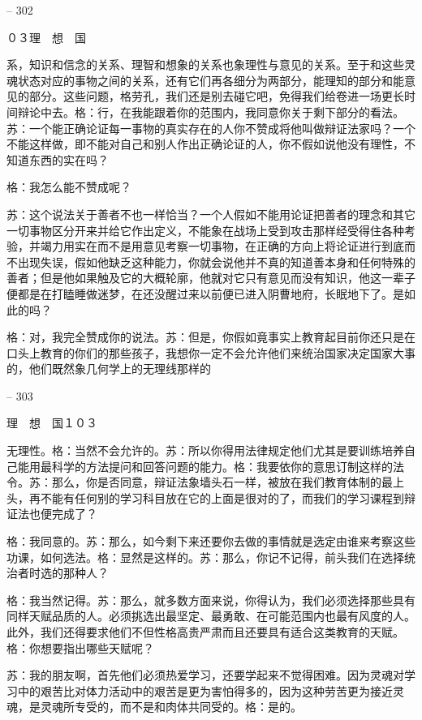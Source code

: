 \documentclass[11pt,oneside]{book}
\begin{document}
\begin{common-format}
    

-- 302

    ０３理　想　国

    系，知识和信念的关系、理智和想象的关系也象理性与意见的关系。至于和这些灵魂状态对应的事物之间的关系，还有它们再各细分为两部分，能理知的部分和能意见的部分。这些问题，格劳孔，我们还是别去碰它吧，免得我们给卷进一场更长时间辩论中去。格：行，在我能跟着你的范围内，我同意你关于剩下部分的看法。苏：一个能正确论证每一事物的真实存在的人你不赞成将他叫做辩证法家吗？一个不能这样做，即不能对自己和别人作出正确论证的人，你不假如说他没有理性，不知道东西的实在吗？

    格：我怎么能不赞成呢？

    苏：这个说法关于善者不也一样恰当？一个人假如不能用论证把善者的理念和其它一切事物区分开来并给它作出定义，不能象在战场上受到攻击那样经受得住各种考验，并竭力用实在而不是用意见考察一切事物，在正确的方向上将论证进行到底而不出现失误，假如他缺乏这种能力，你就会说他并不真的知道善本身和任何特殊的善者；但是他如果触及它的大概轮廓，他就对它只有意见而没有知识，他这一辈子便都是在打瞌睡做迷梦，在还没醒过来以前便已进入阴曹地府，长眠地下了。是如此的吗？

    格：对，我完全赞成你的说法。苏：但是，你假如竟事实上教育起目前你还只是在口头上教育的你们的那些孩子，我想你一定不会允许他们来统治国家决定国家大事的，他们既然象几何学上的无理线那样的

    

-- 303

    理　想　国１０３

    无理性。格：当然不会允许的。苏：所以你得用法律规定他们尤其是要训练培养自己能用最科学的方法提问和回答问题的能力。格：我要依你的意思订制这样的法令。苏：那么，你是否同意，辩证法象墙头石一样，被放在我们教育体制的最上头，再不能有任何别的学习科目放在它的上面是很对的了，而我们的学习课程到辩证法也便完成了？

    格：我同意的。苏：那么，如今剩下来还要你去做的事情就是选定由谁来考察这些功课，如何选法。格：显然是这样的。苏：那么，你记不记得，前头我们在选择统治者时选的那种人？

    格：我当然记得。苏：那么，就多数方面来说，你得认为，我们必须选择那些具有同样天赋品质的人。必须挑选出最坚定、最勇敢、在可能范围内也最有风度的人。此外，我们还得要求他们不但性格高贵严肃而且还要具有适合这类教育的天赋。格：你想要指出哪些天赋呢？

    苏：我的朋友啊，首先他们必须热爱学习，还要学起来不觉得困难。因为灵魂对学习中的艰苦比对体力活动中的艰苦是更为害怕得多的，因为这种劳苦更为接近灵魂，是灵魂所专受的，而不是和肉体共同受的。格：是的。


\end{common-format}
\end{document}
